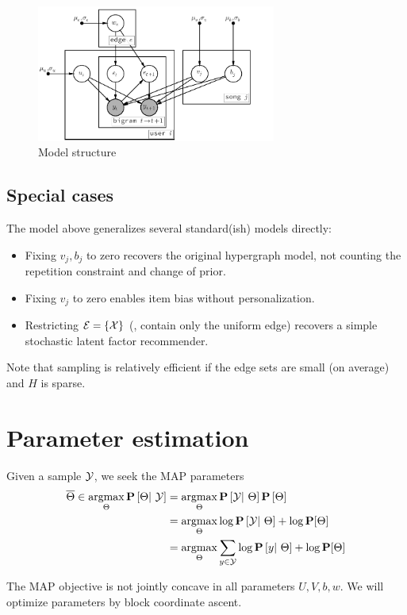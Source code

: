 \documentclass{article}
\begin{document}
\begin{figure}
\centering
\includegraphics[width=0.7\textwidth]{model}
\caption{Model structure}
\end{figure}

\subsection{Special cases}
The model above generalizes several standard(ish) models directly:
\begin{itemize}
\item Fixing $v_j, b_j$ to zero recovers the original hypergraph model, not counting the repetition constraint and
change of prior.
\item Fixing $v_j$ to zero enables item bias without personalization.
\item Restricting $\mathcal{E} = \{ \mathcal{X} \}$ (\ie, contain only the uniform edge) recovers a simple stochastic latent factor recommender.
\end{itemize}

Note that sampling is relatively efficient if the edge sets are small (on average) and $H$ is sparse.

\section{Parameter estimation}
Given a sample $\mathcal{Y}$, we seek the MAP parameters 
\begin{align*}
\overline{\Theta} \in \operatorname*{argmax}_\Theta \mathbf{P}\left[\Theta|~ \mathcal{Y}\right] &= \operatorname*{argmax}_\Theta \mathbf{P}\left[\mathcal{Y}|~\Theta\right]\mathbf{P}\left[\Theta\right]\\
&= \operatorname*{argmax}_\Theta \log \mathbf{P}\left[\mathcal{Y}|~\Theta\right] + \log\mathbf{P}[\Theta]\\
&= \operatorname*{argmax}_\Theta \sum_{y\in\mathcal{Y}} \log \mathbf{P}\left[y|~\Theta\right] + \log\mathbf{P}[\Theta]
\end{align*}

The MAP objective is not jointly concave in all parameters $U, V, b, w$.  We will optimize parameters by block coordinate ascent.
\end{document}
